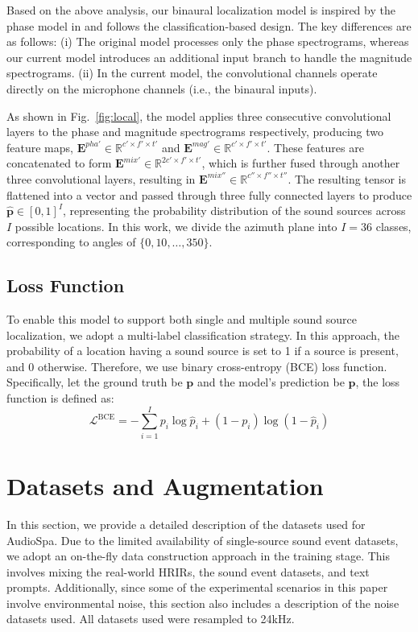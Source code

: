 \documentclass{IEEEtran}
\begin{document}
Based on the above analysis, our binaural localization model is inspired by the phase model in \cite{feng2025eliminating} and follows the classification-based design. The key differences are as follows: (i) The original model processes only the phase spectrograms, whereas our current model introduces an additional input branch to handle the magnitude spectrograms. (ii) In the current model, the convolutional channels operate directly on the microphone channels (i.e., the binaural inputs).

As shown in Fig.~\ref{fig:local}, the model applies three consecutive convolutional layers to the phase and magnitude spectrograms respectively, producing two feature maps, $\mathbf{E}^{pha'} \in \mathbb{R}^{c' \times f' \times t'}$ and $\mathbf{E}^{mag'} \in \mathbb{R}^{c' \times f' \times t'}$. These features are concatenated to form $\mathbf{E}^{mix'} \in \mathbb{R}^{2c' \times f' \times t'}$, which is further fused through another three convolutional layers, resulting in $\mathbf{E}^{mix''} \in \mathbb{R}^{c'' \times f'' \times t''}$. The resulting tensor is flattened into a vector and passed through three fully connected layers to produce $\hat{\mathbf{p}} \in [0, 1]^{I}$, representing the probability distribution of the sound sources across $I$ possible locations. In this work, we divide the azimuth plane into $I=36$ classes, corresponding to angles of $\{0, 10, \dots, 350\}$.


\subsection{Loss Function}
To enable this model to support both single and multiple sound source localization, we adopt a multi-label classification strategy. In this approach, the probability of a location having a sound source is set to 1 if a source is present, and 0 otherwise. Therefore, we use binary cross-entropy (BCE) loss function. Specifically, let the ground truth be $\mathbf{p}$ and the model's prediction be $\hat{\mathbf{p}}$, the loss function is defined as:
\begin{equation}\label{eq:bce}
    \mathcal{L}^{\mathrm{BCE}}=-\sum_{i=1}^I p_i \log \hat{p}_i + (1-p_i) \log (1-\hat{p}_i)
\end{equation}



\section{Datasets and Augmentation}   \label{sec:data}
In this section, we provide a detailed description of the datasets used for AudioSpa. Due to the limited availability of single-source sound event datasets, we adopt an on-the-fly data construction approach in the training stage. This involves mixing the real-world HRIRs, the sound event datasets, and text prompts. Additionally, since some of the experimental scenarios in this paper involve environmental noise, this section also includes a description of the noise datasets used. All datasets used were resampled to 24kHz.
\end{document}
